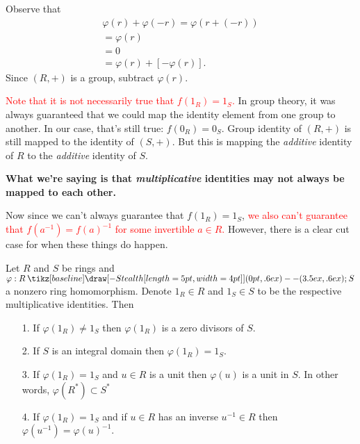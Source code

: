 \documentclass[12pt,letterpaper]{algebra_book}
\renewcommand{\to}{\mathbin{\tikz[baseline] \draw[-{Stealth[length=5pt,width=4pt]}] (0pt,.6ex) -- (3.5ex,.6ex);}}
\renewcommand{\phi}{\varphi}
\theoremstyle{definition}
\begin{document}
    \begin{prf}
        Observe that 
        \begin{align*}
            \phi(r) + \phi(-r) = \phi(r + (-r))\\
            = \phi(r)\\
            = 0\\
            = \phi(r) +[-\phi(r)].
        \end{align*}
        Since $(R, +)$ is a group, subtract $\phi(r)$.
    \end{prf}
    

    \textcolor{red}{Note that it is not necessarily true that
    $f(1_R) = 1_S$.} In group theory, it was always guaranteed
    that we could map the identity element from one group to
    another. In our case, that's still true: $f(0_R) = 0_S$. Group
    identity of $(R,+)$ is still mapped to the identity of $(S, +)$. But
    this is mapping the \textit{additive} identity of $R$ to the
    \textit{additive} identity of $S$. 
    
    \textbf{What we're saying is that
    \textit{multiplicative} identities may not always be mapped to each
    other. }
    
    Now since we can't always guarantee that
    $f(1_R) = 1_S$, \textcolor{red}{we also can't guarantee that $f(a^{-1}) =
    f(a)^{-1}$ for some invertible $a \in R$.}
    However, there is a clear cut case for when these things do
    happen.     
    \\

    \begin{proposition}
        Let $R$ and $S$ be rings and $\phi:R \to S$ a nonzero ring
        homomorphism. Denote $1_R \in R$ and $1_S \in S$ to be the
        respective multiplicative identities. Then 
        \begin{itemize}
            \item[1.] If $\phi(1_R) \ne 1_S$ then $\phi(1_R)$ is a
            zero divisors of $S$. 

            \item[2.] If $S$ is an integral domain then $\phi(1_R)
            = 1_S$. 
            
            \item[3.] If $\phi(1_R) = 1_S$ and $u \in R$ is a unit then
            $\phi(u)$ is a unit in $S$.
            In other words, $\phi(R^*) \subset S^*$

            \item[4.] If $\phi(1_R) = 1_S$ and if $u \in R$ has an
            inverse $u^{-1} \in R$ then $\phi(u^{-1}) = \phi(u)^{-1}$.
        \end{itemize}
    \end{proposition}
\end{document}
